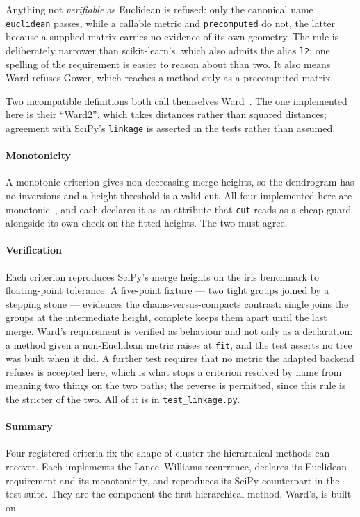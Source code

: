 Anything not \emph{verifiable} as Euclidean is refused: only the
canonical name \texttt{euclidean} passes, while a callable metric and
\texttt{precomputed} do not, the latter because a supplied matrix carries
no evidence of its own geometry. The rule is deliberately narrower than
scikit-learn's, which also admits the alias \texttt{l2}: one spelling of
the requirement is easier to reason about than two. It also means Ward
refuses Gower, which reaches a method only as a precomputed matrix.

Two incompatible definitions both call themselves Ward~\cite{ref_30}. The
one implemented here is their ``Ward2'', which takes distances rather than
squared distances; agreement with SciPy's \texttt{linkage} is asserted in
the tests rather than assumed.

\paragraph{Monotonicity}
\label{sec:tech:linkage:monotonic}
A monotonic criterion gives non-decreasing merge heights, so the
dendrogram has no inversions and a height threshold is a valid cut. All
four implemented here are monotonic~\cite{ref_31}, and each declares it as
an attribute that \texttt{cut} reads as a cheap guard alongside its own
check on the fitted heights. The two must agree.

\paragraph{Verification}
\label{sec:tech:linkage:verification}
Each criterion reproduces SciPy's merge heights on the iris benchmark to
floating-point tolerance. A five-point fixture --- two tight groups joined
by a stepping stone --- evidences the chains-versus-compacts contrast:
single joins the groups at the intermediate height, complete keeps them
apart until the last merge. Ward's requirement is verified as behaviour
and not only as a declaration: a method given a non-Euclidean metric
raises at \texttt{fit}, and the test asserts no tree was built when it
did. A further test requires that no metric the adapted backend refuses
is accepted here, which is what stops a criterion resolved by name from
meaning two things on the two paths; the reverse is permitted, since this
rule is the stricter of the two. All of it
is in \texttt{test\_linkage.py}.

\paragraph{Summary}
\label{sec:tech:linkage:summary}
Four registered criteria fix the shape of cluster the hierarchical methods
can recover. Each implements the Lance--Williams recurrence, declares its
Euclidean requirement and its monotonicity, and reproduces its SciPy
counterpart in the test suite. They are the component the first
hierarchical method, Ward's, is built on.

